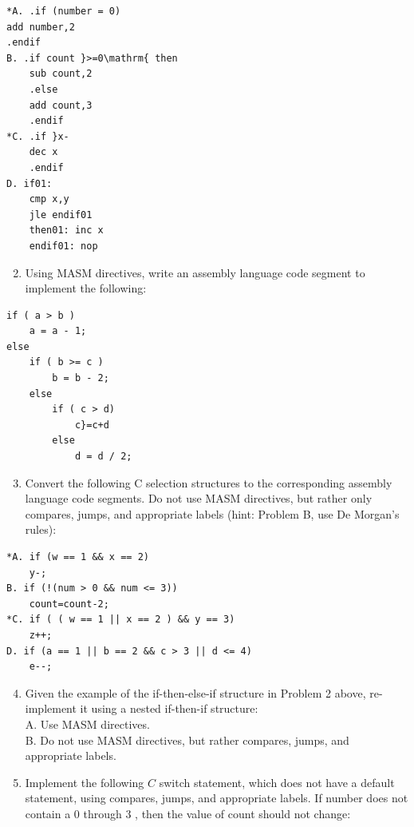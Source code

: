 \documentclass[10pt]{book}
\begin{document}
\begin{verbatim}
*A. .if (number = 0)
add number,2
.endif
B. .if count }>=0\mathrm{ then
    sub count,2
    .else
    add count,3
    .endif
*C. .if }x-
    dec x
    .endif
D. if01:
    cmp x,y
    jle endif01
    then01: inc x
    endif01: nop
\end{verbatim}

\begin{enumerate}
  \setcounter{enumi}{1}
  \item Using MASM directives, write an assembly language code segment to implement the following:
\end{enumerate}

\begin{verbatim}
if ( a > b )
    a = a - 1;
else
    if ( b >= c )
        b = b - 2;
    else
        if ( c > d)
            c}=c+d
        else
            d = d / 2;
\end{verbatim}

\begin{enumerate}
  \setcounter{enumi}{2}
  \item Convert the following C selection structures to the corresponding assembly language code segments. Do not use MASM directives, but rather only compares, jumps, and appropriate labels (hint: Problem B, use De Morgan's rules):
\end{enumerate}

\begin{verbatim}
*A. if (w == 1 && x == 2)
    y-;
B. if (!(num > 0 && num <= 3))
    count=count-2;
*C. if ( ( w == 1 || x == 2 ) && y == 3)
    z++;
D. if (a == 1 || b == 2 && c > 3 || d <= 4)
    e--;
\end{verbatim}

\begin{enumerate}
  \setcounter{enumi}{3}
  \item Given the example of the if-then-else-if structure in Problem 2 above, re-implement it using a nested if-then-if structure:\\
A. Use MASM directives.\\
B. Do not use MASM directives, but rather compares, jumps, and appropriate labels.
  \item Implement the following $C$ switch statement, which does not have a default statement, using compares, jumps, and appropriate labels. If number does not contain a 0 through 3 , then the value of count should not change:
\end{enumerate}
\end{document}
